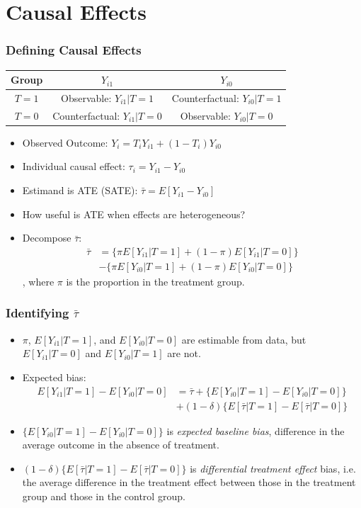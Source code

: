 \documentclass{beamer}
\begin{document}
\section{Causal Effects} %
\label{sec:modern_notation}
\begin{frame}[t]\frametitle{Defining Causal Effects}
	\small
		 \begin{tabular}{ccc}
		\hline
		Group & $Y_{i1}$ & $Y_{i0}$\\
		\hline
		 $T=1$ & Observable: $Y_{i1}|T=1$ & Counterfactual: $Y_{i0}|T=1$\\
		 $T=0$ & Counterfactual: $Y_{i1}|T=0$ & Observable: $Y_{i0}|T=0$\\
		\hline
		\end{tabular}
	\normalsize
	\vspace{.5in}
	\begin{itemize}
		\item<+-> Observed Outcome: $Y_i = T_iY_{i1} + (1-T_i)Y_{i0}$ 
		\item<+-> Individual causal effect: $\tau_i = Y_{i1}-Y_{i0}$	
		\item<+-> Estimand is ATE (SATE): $\bar \tau	 = E[Y_{i1} - Y_{i0}]$	
		\item<+-> How useful is ATE when effects are heterogeneous?  
		\item<+-> Decompose $\bar \tau$:
		\[ \begin{array}{rl}
		\bar \tau &=   \{\pi E[Y_{i1}|T=1] + (1-\pi) E[Y_{i1}|T=0]\} \\
		&- \{\pi E[Y_{i0}|T=1] + (1-\pi) E[Y_{i0}|T=0]\}
		\end{array} \]
		, where $\pi$ is the proportion in the treatment group.		
		\end{itemize}
	\end{frame}
	\begin{frame}[t]\frametitle{Identifying $\bar \tau$}
		\begin{itemize}
			\item<+-> $\pi$, $E[Y_{i1}|T=1]$, and $E[Y_{i0}|T=0]$ are estimable from data, but $E[Y_{i1}|T=0]$ and $E[Y_{i0}|T=1]$ are not.
			\item<+-> Expected bias:
			{\footnotesize 
				\[ \begin{array}{rl}
				E[Y_{i1}|T=1]- E[Y_{i0}|T=0] &=  \bar \tau + \{E[Y_{i0}|T=1] - E[Y_{i0}|T=0]\} \\
				&+(1-\delta) \{E[\bar \tau|T=1] - E[\bar \tau|T=0] \}
			\end{array} \]}
			\item<+-> $\{E[Y_{i0}|T=1] - E[Y_{i0}|T=0]\}$ is \emph{expected baseline bias}, difference in the average outcome in the absence of treatment. 
			\item<+-> $(1-\delta) \{E[\bar \tau|T=1] - E[\bar \tau|T=0] \}$ is \emph{differential treatment effect} bias, i.e. the average difference in the treatment effect between those in the treatment group and those in the control group.
		\end{itemize}		
	\end{frame}
\end{document}
